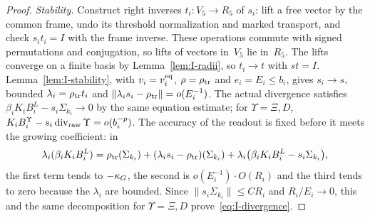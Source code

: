 \begin{proof}
\emph{Stability.} Construct right inverses $t_i:V_5\to R_5$ of $s_i$: lift a free vector by the common frame, undo its threshold normalization and marked transport, and check $s_it_i=I$ with the frame inverse. These operations commute with signed permutations and conjugation, so lifts of vectors in~$V_5$ lie in~$R_5$. The lifts converge on a finite basis by Lemma~\ref{lem:I-radii}, so $t_i\to t$ with $st=I$. Lemma~\ref{lem:I-stability}, with $v_i=v_i^{\rm eq}$, $\rho=\rho_{\rm tr}$ and $e_i=E_i\le b_i$, gives $s_i\to s$, bounded $\lambda_i=\rho_{\rm tr}t_i$ and $\|\lambda_is_i-\rho_{\rm tr}\|=o(E_i^{-1})$.
The actual divergence satisfies $\beta_iK_iB_i^L-s_i\Sigma_{k_i}\to0$ by the same equation estimate; for $\Upsilon=\Xi,D$, $K_iB_i^\Upsilon-s_i\operatorname{div}_{\rm raw}\Upsilon=o(b_i^{-p})$. The accuracy of the readout is fixed before it meets the growing coefficient: in
\begin{equation*}
\lambda_i(\beta_iK_iB_i^L)=\rho_{\rm tr}(\Sigma_{k_i})
+(\lambda_is_i-\rho_{\rm tr})(\Sigma_{k_i})
+\lambda_i\bigl(\beta_iK_iB_i^L-s_i\Sigma_{k_i}\bigr),
\end{equation*}
the first term tends to $-\kappa_G$, the second is $o(E_i^{-1})\cdot O(R_i)$ and the third tends to zero because the $\lambda_i$ are bounded. Since $\|s_i\Sigma_{k_i}\|\le CR_i$ and $R_i/E_i\to0$, this and the same decomposition for $\Upsilon=\Xi,D$ prove~\eqref{eq:I-divergence}.


\end{proof}
